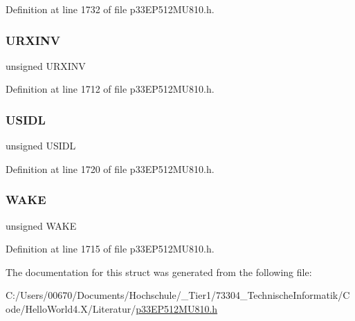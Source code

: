 Definition at line 1732 of file p33\+E\+P512\+M\+U810.\+h.

\mbox{\label{structtag_u2_m_o_d_e_b_i_t_s_ab6387939f9a8bc487f0eab6e20afd53d}} 
\subsubsection{\texorpdfstring{U\+R\+X\+I\+NV}{URXINV}}
{\footnotesize\ttfamily unsigned U\+R\+X\+I\+NV}



Definition at line 1712 of file p33\+E\+P512\+M\+U810.\+h.

\mbox{\label{structtag_u2_m_o_d_e_b_i_t_s_a94d25c6c9271a4ab4f450319e34e2a00}} 
\subsubsection{\texorpdfstring{U\+S\+I\+DL}{USIDL}}
{\footnotesize\ttfamily unsigned U\+S\+I\+DL}



Definition at line 1720 of file p33\+E\+P512\+M\+U810.\+h.

\mbox{\label{structtag_u2_m_o_d_e_b_i_t_s_a364c8b1b2c2f66b23dd1093ced3e20dd}} 
\subsubsection{\texorpdfstring{W\+A\+KE}{WAKE}}
{\footnotesize\ttfamily unsigned W\+A\+KE}



Definition at line 1715 of file p33\+E\+P512\+M\+U810.\+h.



The documentation for this struct was generated from the following file\+:\begin{DoxyCompactItemize}
\item 
C\+:/\+Users/00670/\+Documents/\+Hochschule/\+\_\+\+Tier1/73304\+\_\+\+Technische\+Informatik/\+Code/\+Hello\+World4.\+X/\+Literatur/\hyperlink{p33_e_p512_m_u810_8h}{p33\+E\+P512\+M\+U810.\+h}\end{DoxyCompactItemize}
